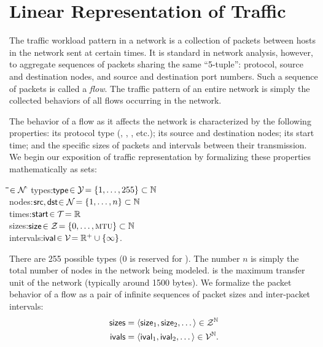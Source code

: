 \documentclass[twocolumn,final]{svjour3}
\begin{document}
\section{Linear Representation of Traffic}
\label{sec:representations}

The traffic workload pattern in a network is a collection of  packets between hosts in the network sent at certain times.
It is standard in network analysis, however, to aggregate sequences of packets sharing the same ``5-tuple'':
 protocol, source and destination nodes, and source and destination  port numbers.
Such a sequence of packets is called a \textit{flow}.
The traffic pattern of an entire network is simply the collected behaviors of all flows occurring in the network.

The behavior of a flow as it affects the network is characterized by the following properties:
its  protocol type (, , , etc.);
its source and destination nodes;
its start time;
and the specific sizes of packets and intervals between their transmission.
We begin our exposition of traffic representation by formalizing these properties mathematically as sets:
\begin{tabbing}
\hspace{1em}\=\bullet\hspace{0.5em}\=\hspace{5em}\=\hspace{4em}\=$\in\mathcal{N}\,$\=\kill
\>\bullet\>types:\>$\text{\textsf{type}}$\>$\in\mathcal{Y}$\>$= {\left\{1,\dots,255\right\}} \subset \mathbb{N}$ \\
\>\bullet\>nodes:\>$\text{\textsf{src}},\text{\textsf{dst}}$\>$\in\mathcal{N}$\>$= {\left\{1,\dots,n\right\}} \subset \mathbb{N}$ \\
\>\bullet\>times:\>$\text{\textsf{start}}$\>$\in\mathcal{T}$\>$= \mathbb{R}$ \\
\>\bullet\>sizes:\>$\text{\textsf{size}}$\>$\in\mathcal{Z}$\>$= \set{0,\dots,\text{\caps{MTU}}} \subset \N$ \\
\>\bullet\>intervals:\>$\text{\textsf{ival}}$\>$\in\mathcal{V}$\>$ = \mathbb{R}^+ \cup {\left\{\infty\right\}}$.
\end{tabbing}
There are 255 possible  types (0 is reserved for ).
The number $n$ is simply the total number of nodes in the network being modeled.
 is the maximum transfer unit of the network (typically around 1500 bytes).
We formalize the packet behavior of a flow as a pair of infinite sequences of packet sizes and inter-packet intervals:
\begin{align}
\text{\textsf{sizes}} &= {\left<\text{\textsf{size}}_1,\text{\textsf{size}}_2,\dots\right>} \in \mathcal{Z}^{\mathbb{N}} \\
\text{\textsf{ivals}} &= {\left<\text{\textsf{ival}}_1,\text{\textsf{ival}}_2,\dots\right>} \in \mathcal{V}^{\mathbb{N}}.
\end{align}
\end{document}
